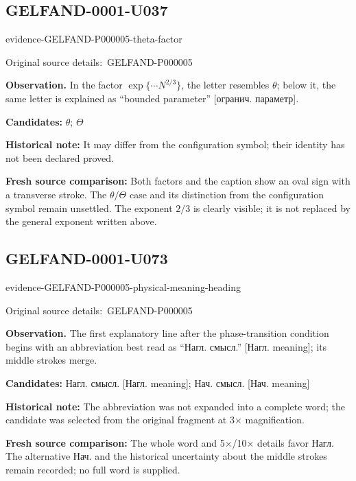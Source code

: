 \documentclass[11pt]{article}
\newcommand{\EvidenceBlock}[4]{%
 \par\smallskip\noindent\begin{minipage}{\linewidth}
 \begin{minipage}[t]{.47\linewidth}\vspace{0pt}\centering
 \csname evidence-#1-#2\endcsname\par
 {\scriptsize\SourceCropCaption\ #1}\par
 \end{minipage}\hfill
 \begin{minipage}[t]{.49\linewidth}\vspace{0pt}\raggedright
 {\small\color{orange!65!black}\textbf{#4} #3}\par
 \end{minipage}
 \end{minipage}\par\smallskip}
\newcommand{\SourceCropCaption}{Original source details:}\newcommand{\ReadingCaption}{Uncertain reading.}\newcommand{\IncompleteCaption}{Undeciphered passage.}\newcommand{\DiagramCaption}{Diagram and typed description.}
\begin{document}
\subsection*{GELFAND-0001-U037}
\EvidenceBlock{GELFAND-P000005}{theta-factor}{In the factor \(\exp\{\cdots N^{2/3}\}\), the letter resembles \(\theta\); below it, the same letter is explained as “bounded parameter” [огранич. параметр].}{Observation.}
\par\smallskip\noindent\textbf{Candidates: } \(\theta\); \(\Theta\)\par
\par\smallskip\noindent\textbf{Historical note: } It may differ from the configuration symbol; their identity has not been declared proved.\par
\par\smallskip\noindent\textbf{Fresh source comparison: } Both factors and the caption show an oval sign with a transverse stroke. The \(\theta/\Theta\) case and its distinction from the configuration symbol remain unsettled. The exponent \(2/3\) is clearly visible; it is not replaced by the general exponent written above.\par

\subsection*{GELFAND-0001-U073}
\EvidenceBlock{GELFAND-P000005}{physical-meaning-heading}{The first explanatory line after the phase-transition condition begins with an abbreviation best read as “Нагл. смысл.” [Нагл. meaning]; its middle strokes merge.}{Observation.}
\par\smallskip\noindent\textbf{Candidates: } Нагл. смысл. [Нагл. meaning]; Нач. смысл. [Нач. meaning]\par
\par\smallskip\noindent\textbf{Historical note: } The abbreviation was not expanded into a complete word; the candidate was selected from the original fragment at 3× magnification.\par
\par\smallskip\noindent\textbf{Fresh source comparison: } The whole word and 5×/10× details favor Нагл. The alternative Нач. and the historical uncertainty about the middle strokes remain recorded; no full word is supplied.\par
\end{document}
